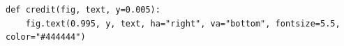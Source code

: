 \begin{lstlisting}[firstnumber=127]
def credit(fig, text, y=0.005):
    fig.text(0.995, y, text, ha="right", va="bottom", fontsize=5.5, color="#444444")
\end{lstlisting}
